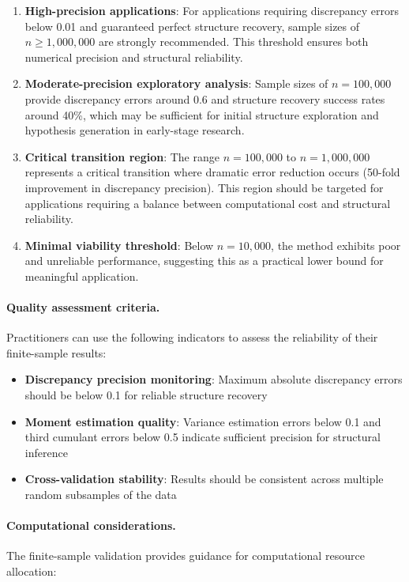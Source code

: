 \documentclass[11pt,a4paper]{article}
\numberwithin{equation}{section}
\begin{document}
\begin{enumerate}[label=(\arabic*)]
\item \textbf{High-precision applications}: For applications requiring discrepancy errors below 0.01 and guaranteed perfect structure recovery, sample sizes of $n \geq 1{,}000{,}000$ are strongly recommended. This threshold ensures both numerical precision and structural reliability.

\item \textbf{Moderate-precision exploratory analysis}: Sample sizes of $n = 100{,}000$ provide discrepancy errors around 0.6 and structure recovery success rates around 40\%, which may be sufficient for initial structure exploration and hypothesis generation in early-stage research.

\item \textbf{Critical transition region}: The range $n = 100{,}000$ to $n = 1{,}000{,}000$ represents a critical transition where dramatic error reduction occurs (50-fold improvement in discrepancy precision). This region should be targeted for applications requiring a balance between computational cost and structural reliability.

\item \textbf{Minimal viability threshold}: Below $n = 10{,}000$, the method exhibits poor and unreliable performance, suggesting this as a practical lower bound for meaningful application.
\end{enumerate}

\paragraph{Quality assessment criteria.} Practitioners can use the following indicators to assess the reliability of their finite-sample results:

\begin{itemize}
\item \textbf{Discrepancy precision monitoring}: Maximum absolute discrepancy errors should be below 0.1 for reliable structure recovery
\item \textbf{Moment estimation quality}: Variance estimation errors below 0.1 and third cumulant errors below 0.5 indicate sufficient precision for structural inference
\item \textbf{Cross-validation stability}: Results should be consistent across multiple random subsamples of the data
\end{itemize}

\paragraph{Computational considerations.} The finite-sample validation provides guidance for computational resource allocation:
\end{document}
